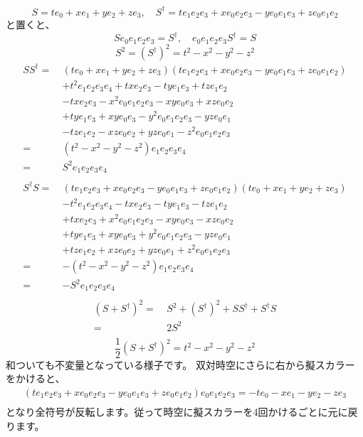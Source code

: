 \documentclass[a4paper,12pt,notitlepage]{jsreport}
\begin{document}
\begin{equation}
  S=te_0+xe_1+ye_2+ze_3,\quad S^\dag=te_1e_2e_3+xe_0e_2e_3-ye_0e_1e_3+ze_0e_1e_2
\end{equation}
と置くと、
\begin{equation}
  Se_0e_1e_2e_3=S^\dag, \quad e_0e_1e_2e_3S^\dag=S
\end{equation}
\begin{equation}
  S^2=(S^\dag)^2=t^2-x^2-y^2-z^2
\end{equation}
\begin{equation}
  \begin{split}
    SS^\dag=~&(te_0+xe_1+ye_2+ze_3)(te_1e_2e_3+xe_0e_2e_3-ye_0e_1e_3+ze_0e_1e_2)\\
    &+t^2e_1e_2e_3e_4+txe_2e_3-tye_1e_3+tze_1e_2\\
    &-txe_2e_3-x^2e_0e_1e_2e_3-xye_0e_3+xze_0e_2\\
    &+tye_1e_3+xye_0e_3-y^2e_0e_1e_2e_3-yze_0e_1\\
    &-tze_1e_2-xze_0e_2+yze_0e_1-z^2e_0e_1e_2e_3\\
    =~&(t^2-x^2-y^2-z^2)e_1e_2e_3e_4\\
    =~&S^2e_1e_2e_3e_4\\
  \end{split}
\end{equation}
\begin{equation}
  \begin{split}
    S^\dag S=~&(te_1e_2e_3+xe_0e_2e_3-ye_0e_1e_3+ze_0e_1e_2)(te_0+xe_1+ye_2+ze_3)\\
    &-t^2e_1e_2e_3e_4-txe_2e_3-tye_1e_3-tze_1e_2\\
    &+txe_2e_3+x^2e_0e_1e_2e_3-xye_0e_3-xze_0e_2\\
    &+tye_1e_3+xye_0e_3+y^2e_0e_1e_2e_3-yze_0e_1\\
    &+tze_1e_2+xze_0e_2+yze_0e_1+z^2e_0e_1e_2e_3\\
    =~&-(t^2-x^2-y^2-z^2)e_1e_2e_3e_4\\
    =~&-S^2e_1e_2e_3e_4\\
  \end{split}
\end{equation}
\begin{equation}
  \begin{split}
    (S+S^\dag)^2=~&S^2+(S^\dag)^2+SS^\dag+S^\dag S\\
    =~&2S^2\\
  \end{split}
\end{equation}
\begin{equation}
  \frac{1}{2}(S+S^\dag)^2=t^2-x^2-y^2-z^2
\end{equation}
和ついても不変量となっている様子です。
双対時空にさらに右から擬スカラーをかけると、
\begin{equation}
  \begin{split}
    (t e_1e_2e_3 + x e_0e_2e_3 - y e_0e_1e_3 + z e_0e_1e_2) e_0e_1e_2e_3 = 
    - t e_0 - x e_1 - y e_2 - z e_3 \\
  \end{split}
\end{equation}
となり全符号が反転します。従って時空に擬スカラーを4回かけるごとに元に戻ります。
\end{document}
